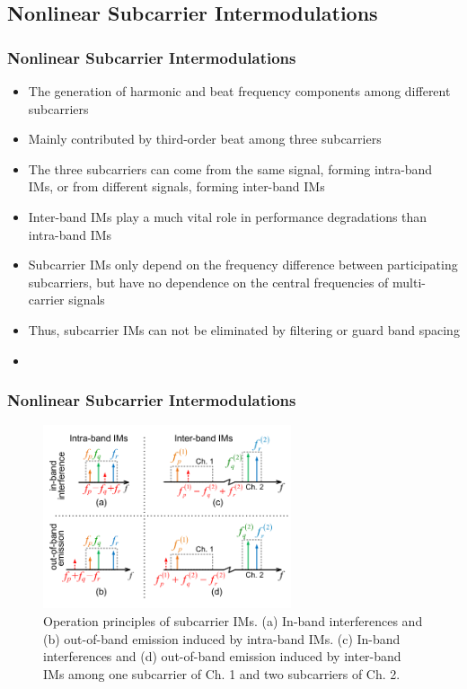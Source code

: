 \documentclass[t]{beamer}
\begin{document}
\subsection{Nonlinear Subcarrier Intermodulations}

\begin{frame}
    \frametitle{Nonlinear Subcarrier Intermodulations \cite{Wang2017}}
    \begin{itemize}
        \item The generation of harmonic and beat frequency components among different subcarriers
        \item Mainly contributed by third-order beat among three subcarriers
        \item The three subcarriers can come from the same signal, forming intra-band IMs, or from different signals, forming inter-band IMs
        \item Inter-band IMs play a much vital role in performance degradations than intra-band IMs
        \item Subcarrier IMs only depend on the frequency difference between participating subcarriers, but have no dependence on the central frequencies of multi-carrier signals
        \item Thus, subcarrier IMs can not be eliminated by filtering or guard band spacing
        \item 
    \end{itemize}
\end{frame}
\begin{frame}
    \frametitle{Nonlinear Subcarrier Intermodulations \cite{Wang2017}}

    \begin{figure}[h]

        \includegraphics[width=0.65\textwidth]{IM}
        \caption{Operation principles of subcarrier IMs. (a) In-band interferences and (b) out-of-band emission induced by intra-band IMs. (c) In-band interferences and (d) out-of-band emission induced by inter-band IMs among one subcarrier of Ch. 1 and two subcarriers of Ch. 2.}
    \end{figure}
    
    
\end{frame}
\end{document}
